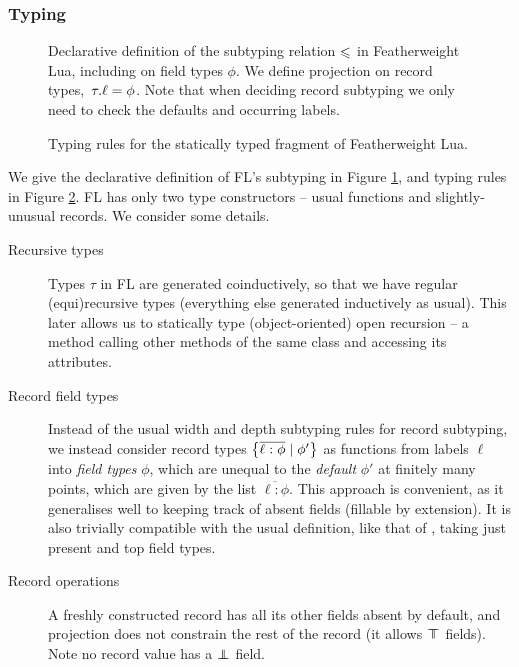 \subsubsection{Typing}

\begin{figure}
    \centering
    
    \caption{Declarative definition of the subtyping relation $\leqslant$ in Featherweight Lua, including on field types $\phi$. We define projection on record types,~${\tau}{.}{\ell} = \phi$. Note that when deciding record subtyping we only need to check the defaults and occurring labels.}
    \label{fig:featherweight-lua-subtyping}
\end{figure}

\begin{figure}
    
    \caption{Typing rules for the statically typed fragment of Featherweight Lua.}
    \label{fig:featherweight-lua-typing}
\end{figure}

We give the declarative definition of FL's subtyping in Figure \ref{fig:featherweight-lua-subtyping}, and typing rules in Figure \ref{fig:featherweight-lua-typing}.
FL has only two type constructors -- usual functions and slightly-unusual records. We consider some details.

\begin{description}
    \item[Recursive types] Types $\tau$ in FL are generated coinductively, so that we have regular (equi)recursive types (everything else generated inductively as usual). This later allows us to statically type (object-oriented) open recursion -- a method calling other methods of the same class and accessing its attributes.
    \item[Record field types] Instead of the usual width and depth subtyping rules for record subtyping, we instead consider record types $\flrec{\overline{\ell : \phi} \mid \phi'}$ as functions from labels $\ell$ into \emph{field types} $\phi$, which are unequal to the \emph{default} $\phi'$ at finitely many points, which are given by the list $\overline{\ell : \phi}$. This approach is convenient, as it generalises well to keeping track of absent fields (fillable by extension). It is also trivially compatible with the usual definition, like that of \textcite{tapl}, taking just present and top field types.
    \item[Record operations] A freshly constructed record has all its other fields absent by default, and projection does not constrain the rest of the record (it allows $\top \!\!\!\! \top$ fields). Note no record value has a $\bot \!\!\!\! \bot$ field.
\end{description}

